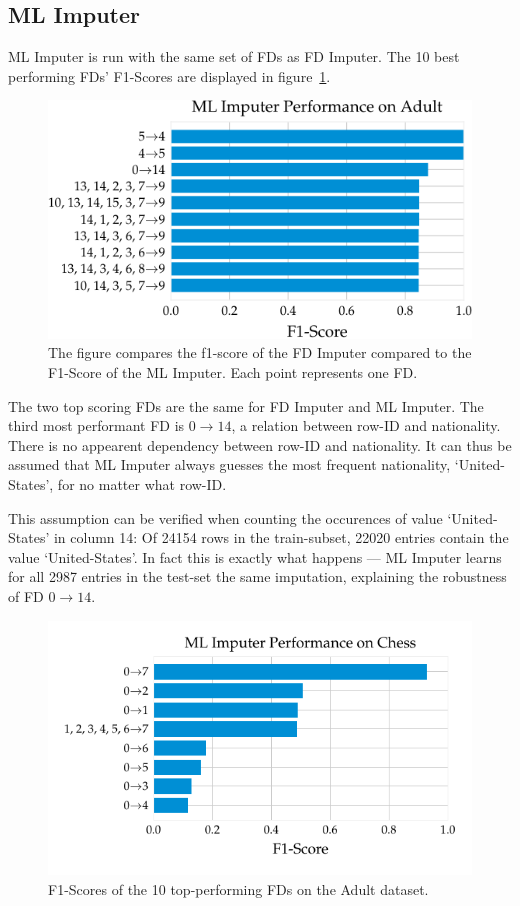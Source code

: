 \subsection{ML Imputer}
ML Imputer is run with the same set of FDs as FD Imputer.
The 10 best performing FDs' F1-Scores are displayed in figure~\ref{fig:f1_ml_adult}.
\begin{figure}[ht]
     \centering
     \includegraphics[width=.8\textwidth]{../figures/adult/f1_ml_imputer_adult.pdf}
     \caption{The figure compares the f1-score of the FD Imputer compared to the F1-Score of the ML Imputer. Each point represents one FD.}
     \label{fig:f1_ml_adult}
 \end{figure}
The two top scoring FDs are the same for FD Imputer and ML Imputer.
The third most performant FD is \( 0 \rightarrow 14\), a relation between row-ID and nationality.
There is no appearent dependency between row-ID and nationality.
It can thus be assumed that ML Imputer always guesses the most frequent nationality, `United-States', for no matter what row-ID.

This assumption can be verified when counting the occurences of value `United-States' in column 14:
Of 24154 rows in the train-subset, 22020 entries contain the value `United-States'.
In fact this is exactly what happens --- ML Imputer learns for all 2987 entries in the test-set the same imputation, explaining the robustness of FD \( 0 \rightarrow 14\).

\begin{figure}[ht]
     \centering
     \includegraphics[width=.8\textwidth]{../figures/chess/f1_ml_imputer_chess.pdf}
     \caption{F1-Scores of the 10 top-performing FDs on the Adult dataset.}
     \label{fig:f1-ml-imputer-chess}
 \end{figure}

